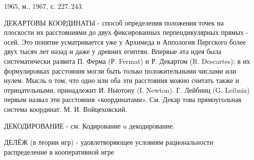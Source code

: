 \documentclass[10pt]{article}
\begin{document}
1965, м., 1967, с. $227,243$.



ДЕКАРТОВЫ КООРДИНАТЫ - способ определения положения точек на плоскости их расстояниями до двух фиксированных перпендикулярных прямых - осей. Это понятие усматривается уже у Архимеда и Аппология Пергского более двух тысяч лет назад и даже у древних египтян. Впервые әта идея была систематически развита П. Ферма (Р. Fermat) и Р. Декартом (R. Descartes); в их формулировках расстояния могли быть только положительными числами или нулем. Мысль о том, что одно или оба эти расстояния можно считать также и отрицательными, принадлежит И. Ньютону (I. Newton). Г. Лейбниц (G. Leibniz) первым назвал эти расстояния «координатами». См. Декар това прямоугольная система координат. М. И. Войцеховский.



ДЕКОДИРОВАНИЕ - см. Кодирование $u$ декодирование.



ДЕЛЁЖ (в теории игр) - удовлетворяющее условиям рациональности распределение в кооперативной игре
\end{document}
